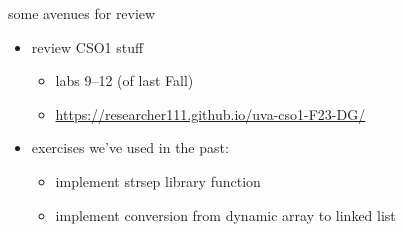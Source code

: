 
\begin{frame}{some avenues for review}
    \begin{itemize}
    \item review CSO1 stuff
        \begin{itemize}
        \item labs 9--12 (of last Fall)
        \item \url{https://researcher111.github.io/uva-cso1-F23-DG/}
        \end{itemize}
    \item exercises we've used in the past:
        \begin{itemize}
        \item implement strsep library function
        \item implement conversion from dynamic array to linked list
        \end{itemize}
    \end{itemize}
\end{frame}

\usetikzlibrary{shapes.misc}

